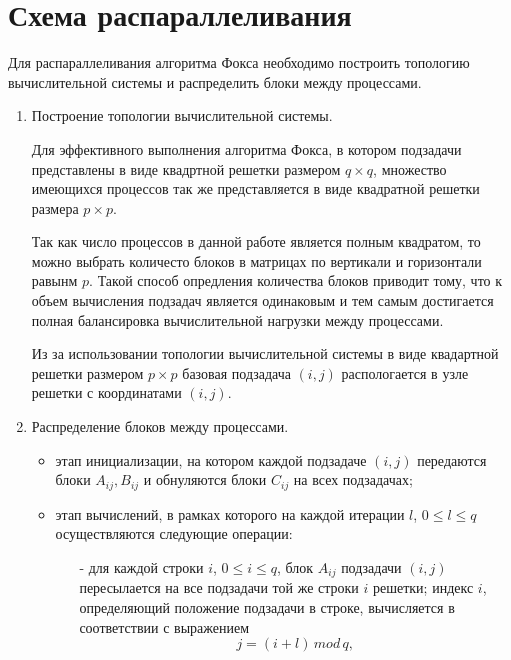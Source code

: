 \documentclass{report}
\begin{document}
\section*{Схема распараллеливания}
Для распараллеливания алгоритма Фокса необходимо построить топологию вычислительной системы и распределить блоки между процессами.

\begin{enumerate}
    \item Построение топологии вычислительной системы.
        \par Для эффективного выполнения алгоритма Фокса, в котором подзадачи представлены в виде квадртной решетки размером {\itshape $q \times q$}, множество имеющихся процессов так же представляется в виде квадратной решетки размера {\itshape $p \times p$}.
        \par Так как число процессов в данной работе является полным квадратом, то можно выбрать количесто блоков в матрицах по вертикали и горизонтали равынм {\itshape $p$}. Такой способ опредления количества блоков приводит тому, что к объем вычисления подзадач является одинаковым и тем самым достигается полная балансировка вычислительной нагрузки между процессами.
        \par Из за использовании топологии вычислительной системы в виде квадартной решетки размером {\itshape $p \times p$} базовая подзадача {\itshape $(i,j)$} распологается в узле решетки с координатами {\itshape $(i,j)$}.
    \item Распределение блоков между процессами.
        \begin{itemize}
            \item этап инициализации, на котором каждой подзадаче {\itshape $(i,j)$} передаются блоки {\itshape $A_{ij}, B_{ij}$} и обнуляются блоки {\itshape $C_{ij}$} на всех подзадачах;
            \item этап вычислений, в рамках которого на каждой итерации {\itshape $l$}, {\itshape $0 \le l \le q$} осуществляются следующие операции:
            \begin{itemize}
                \item[-] для каждой строки {\itshape $i$}, {\itshape $0 \le i \le q$}, блок {\itshape $A_{ij}$} подзадачи {\itshape $(i,j)$} пересылается на все подзадачи той же строки {\itshape $i$} решетки; индекс {\itshape $i$}, определяющий положение подзадачи в строке, вычисляется в соответствии с выражением
                $$
                {\mathit j = (i + l) \, mod \, q,}
$$
\end{itemize}
\end{itemize}
\end{enumerate}
\end{document}
